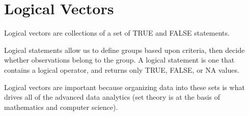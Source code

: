 \documentclass[]{book}
\theoremstyle{definition}
\theoremstyle{definition}
\theoremstyle{definition}
\theoremstyle{remark}
\begin{document}
\hypertarget{logical-vectors}{%
\section{Logical Vectors}\label{logical-vectors}}

Logical vectors are collections of a set of TRUE and FALSE statements.

Logical statements allow us to define groups based upon criteria, then
decide whether observations belong to the group. A logical statement is
one that contains a logical operator, and returns only TRUE, FALSE, or
NA values.

Logical vectors are important because organizing data into these sets is
what drives all of the advanced data analytics (set theory is at the
basis of mathematics and computer science).
\end{document}
